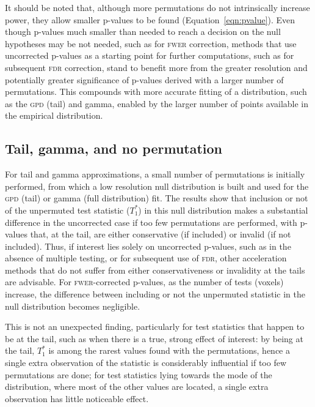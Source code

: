 It should be noted that, although more permutations do not intrinsically increase power, they allow smaller p-values to be found (Equation~\ref{eqn:pvalue}). Even though p-values much smaller than needed to reach a decision on the null hypotheses may be not needed, such as for \textsc{fwer} correction, methods that use uncorrected p-values as a starting point for further computations, such as for subsequent \textsc{fdr} correction, stand to benefit more from the greater resolution and potentially greater significance of p-values derived with a larger number of permutations. This compounds with more accurate fitting of a distribution, such as the \textsc{gpd} (tail) and gamma, enabled by the larger number of points available in the empirical distribution.

\subsection{Tail, gamma, and no permutation}

For tail and gamma approximations, a small number of permutations is initially performed, from which a low resolution null distribution is built and used for the \textsc{gpd} (tail) or gamma (full distribution) fit. The results show that inclusion or not of the unpermuted test statistic ($T^*_1$) in this null distribution makes a substantial difference in the uncorrected case if too few permutations are performed, with p-values that, at the tail, are either conservative (if included) or invalid (if not included). Thus, if interest lies solely on uncorrected p-values, such as in the absence of multiple testing, or for subsequent use of \textsc{fdr}, other acceleration methods that do not suffer from either conservativeness or invalidity at the tails are advisable. For \textsc{fwer}-corrected p-values, as the number of tests (voxels) increase, the difference between including or not the unpermuted statistic in the null distribution becomes negligible.

This is not an unexpected finding, particularly for test statistics that happen to be at the tail, such as when there is a true, strong effect of interest: by being at the tail, $T^*_1$ is among the rarest values found with the permutations, hence a single extra observation of the statistic is considerably influential if too few permutations are done; for test statistics lying towards the mode of the distribution, where most of the other values are located, a single extra observation has little noticeable effect.

